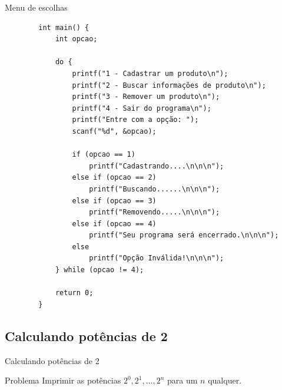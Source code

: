 \documentclass[handout]{beamer}
\begin{document}
\begin{frame}[fragile]{Menu de escolhas}
    
    \begin{verbatim}
        int main() {
            int opcao;
            
            do {
                printf("1 - Cadastrar um produto\n");
                printf("2 - Buscar informações de produto\n");
                printf("3 - Remover um produto\n");
                printf("4 - Sair do programa\n");
                printf("Entre com a opção: ");
                scanf("%d", &opcao);

                if (opcao == 1)
                    printf("Cadastrando....\n\n\n");
                else if (opcao == 2)
                    printf("Buscando......\n\n\n");
                else if (opcao == 3)
                    printf("Removendo.....\n\n\n");
                else if (opcao == 4)
                    printf("Seu programa será encerrado.\n\n\n");
                else
                    printf("Opção Inválida!\n\n\n");
            } while (opcao != 4);

            return 0;
        }
    \end{verbatim}
\end{frame}

\subsection{Calculando potências de 2}%

\begin{frame}{Calculando potências de 2}
    \begin{block}{Problema}
        Imprimir as potências $2^0, 2^1, \ldots, 2^n$ para um $n$ qualquer.
    \end{block}
\end{frame}
\end{document}
